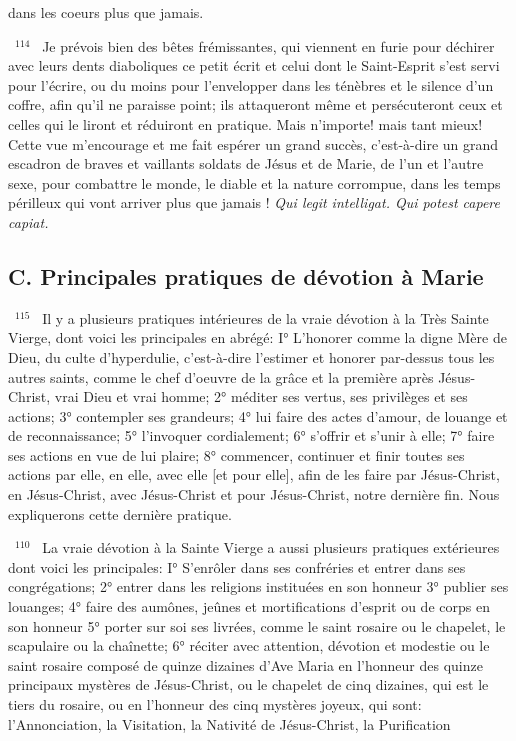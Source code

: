 \documentclass[paper=a5,pagesize=pdftex,fontsize=15pt,headinclude=on,twoside=off]{scrbook}
\newcommand{\negphantom}[1]{\settowidth{\dimen0}{#1}\hspace*{-\dimen0}}
\newcommand{\versenb}[1]{\par \vspace{10pt}~\negphantom{~${}^{#1}$~}${}^{#1}$~}
\newcommand{\latin}[1]{\emph{#1}}
\begin{document}
dans les coeurs plus que jamais.
\versenb{114} Je prévois bien des bêtes frémissantes, qui viennent en furie pour déchirer avec leurs dents diaboliques ce
petit écrit et celui dont le Saint-Esprit s'est servi pour l'écrire, ou du moins pour l'envelopper dans les ténèbres et le
silence d'un coffre, afin qu'il ne paraisse point; ils attaqueront même et persécuteront ceux et celles qui le liront et
réduiront en pratique. Mais n'importe! mais tant mieux! Cette vue m'encourage et me fait espérer un grand succès,
c'est-à-dire un grand escadron de braves et vaillants soldats de Jésus et de Marie, de l'un et l'autre sexe, pour
combattre le monde, le diable et la nature corrompue, dans les temps périlleux qui vont arriver plus que jamais !
\latin{Qui legit intelligat. Qui potest capere capiat.}
\subsection{C. Principales pratiques de dévotion à Marie}
\versenb{115} Il y a plusieurs pratiques intérieures de la vraie dévotion à la Très Sainte Vierge, dont voici les principales en
abrégé:
I° L'honorer comme la digne Mère de Dieu, du culte d'hyperdulie, c'est-à-dire l'estimer et honorer par-dessus tous
les autres saints, comme le chef d'oeuvre de la grâce et la première après Jésus-Christ, vrai Dieu et vrai homme;
2° méditer ses vertus, ses privilèges et ses actions; 3° contempler ses grandeurs; 4° lui faire des actes d'amour, de
louange et de reconnaissance; 5° l'invoquer cordialement; 6° s'offrir et s'unir à elle; 7° faire ses actions en vue de
lui plaire; 8° commencer, continuer et finir toutes ses actions par elle, en elle, avec elle [et pour elle], afin de les
faire par Jésus-Christ, en Jésus-Christ, avec Jésus-Christ et pour Jésus-Christ, notre dernière fin. Nous
expliquerons cette dernière pratique.
\versenb{110} La vraie dévotion à la Sainte Vierge a aussi plusieurs pratiques extérieures dont voici les principales:
I° S'enrôler dans ses confréries et entrer dans ses congrégations; 2° entrer dans les religions instituées en son
honneur 3° publier ses louanges; 4° faire des aumônes, jeûnes et mortifications d'esprit ou de corps en son
honneur 5° porter sur soi ses livrées, comme le saint rosaire ou le chapelet, le scapulaire ou la chaînette; 6° réciter
avec attention, dévotion et modestie ou le saint rosaire composé de quinze dizaines d'Ave Maria en l'honneur des
quinze principaux mystères de Jésus-Christ, ou le chapelet de cinq dizaines, qui est le tiers du rosaire, ou en
l'honneur des cinq mystères joyeux, qui sont: l'Annonciation, la Visitation, la Nativité de Jésus-Christ, la Purification
\end{document}

